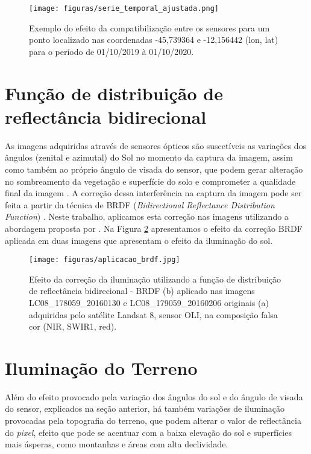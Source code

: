 \begin{figure}[H]
\centering
\caption{Exemplo do efeito da compatibilização entre os sensores para um ponto localizado nas coordenadas -45,739364 e -12,156442 (lon, lat) para o período de 01/10/2019 à 01/10/2020.}
\label{fig:serie_temporal_corrigida}
\texttt{[image: figuras/serie\_temporal\_ajustada.png]}
\label{fig:correcao_brdf}
\end{figure}


\section{Função de distribuição de reflectância bidirecional}

As imagens adquiridas através de sensores ópticos são suscetíveis as variações dos ângulos (zenital e azimutal) do Sol no momento da captura da imagem, assim como também ao próprio ângulo de visada do sensor, que podem gerar alteração no sombreamento da vegetação e superfície do solo e comprometer a qualidade final da imagem \cite{hadjimitsis2010atmospheric}. A correção dessa interferência na captura da imagem pode ser feita a partir da técnica de BRDF (\textit{Bidirectional Reflectance Distribution Function}) \cite{schaaf2002first}. Neste trabalho, aplicamos esta correção nas imagens utilizando a abordagem proposta por . Na Figura \ref{fig:correcao_brdf} apresentamos o efeito da correção BRDF aplicada em duas imagens que apresentam o efeito da iluminação do sol. 

\begin{figure}[H]
\caption{Efeito da correção da iluminação utilizando a função de distribuição de reflectância bidirecional - BRDF (b) aplicado nas imagens LC08\_178059\_20160130 e LC08\_179059\_20160206 originais (a) adquiridas pelo satélite Landsat 8, sensor OLI, na composição falsa cor (NIR, SWIR1, red).}
\label{fig:correcao_brdf}
\centering
\texttt{[image: figuras/aplicacao\_brdf.jpg]}
\end{figure}

\section{Iluminação do Terreno}

Além do efeito provocado pela variação dos ângulos do sol e do ângulo de visada do sensor, explicados na seção anterior, há também variações de iluminação provocadas pela topografia do terreno, que podem alterar o valor de reflectância do \textit{pixel}, efeito que pode se acentuar com a baixa elevação do sol e superfícies mais ásperas, como montanhas e áreas com alta declividade. 

